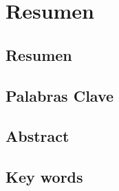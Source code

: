 \chapter*{Resumen}

\section*{Resumen}


\section*{Palabras Clave}

\newpage

\section*{Abstract}


\section*{Key words}
